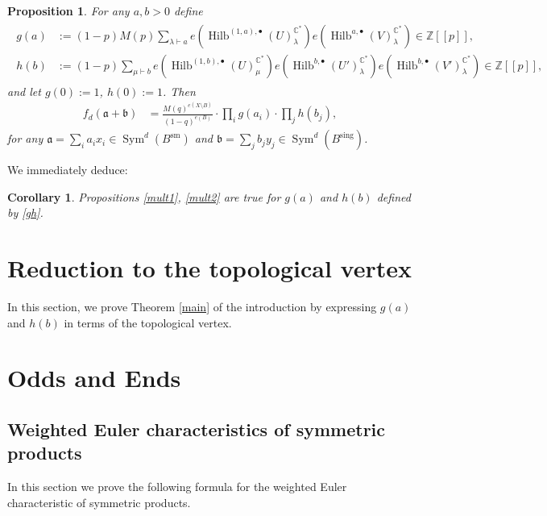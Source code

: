 \documentclass{amsart}
\newtheorem{proposition}[theorem]{Proposition}
\newtheorem{corollary}[theorem]{Corollary}
\theoremstyle{definition}
\newcommand{\CC} {\mathbb{C}}          %
\newcommand{\ZZ} {\mathbb{Z}}		%
\newcommand{\Sym}{\operatorname{Sym}}
\newcommand{\Hilb}{\operatorname{Hilb}}
\newcommand{\sm}{\operatorname{sm}}
\newcommand{\sing}{\operatorname{sing}}
\begin{document}
\begin{proposition}
For any $a,b>0$ define
\begin{align}
\begin{split} \label{gh}
g(a) &:= (1-p) M(p) \sum_{\lambda \vdash a} e(\Hilb^{(1,a),\bullet}(U)_{\lambda}^{\CC^*}) e(\Hilb^{a,\bullet}(V)_{\lambda}^{\CC^*}) \in \ZZ[\![p]\!], \\
h(b) &:= (1-p) \sum_{\mu \vdash b} e(\Hilb^{(1,b),\bullet}(U)_{\mu}^{\CC^*}) e(\Hilb^{b,\bullet}(U')_{\lambda}^{\CC^*}) e(\Hilb^{b,\bullet}(V')_{\lambda}^{\CC^*})  \in \ZZ[\![p]\!],
\end{split}
\end{align}
and let $g(0) := 1$, $h(0) :=1$. Then
\begin{align*}
f_{d}(\mathfrak{a} + \mathfrak{b}) &= \frac{M(q)^{e(X\setminus B)}}{(1-q)^{e(B)}} \cdot \prod_{i} g(a_i) \cdot \prod_{j} h(b_j), 
\end{align*}
for any $\mathfrak{a} = \sum_i a_i x_i \in \Sym^{d}(B^{\sm})$ and $\mathfrak{b} = \sum_j b_j y_j \in \Sym^{d}(B^{\sing})$.
\end{proposition}
   
We immediately deduce:  
\begin{corollary}
Propositions \ref{mult1}, \ref{mult2} are true for $g(a)$ and $h(b)$ defined by \eqref{gh}.
\end{corollary}   
   
   
\section{Reduction to the topological vertex}   

In this section, we prove Theorem \ref{main} of the introduction by expressing $g(a)$ and $h(b)$ in terms of the topological vertex. 
   
   

\appendix
\section{Odds and Ends}\label{appendix: odds and ends}


\subsection{Weighted Euler characteristics of symmetric products}

In this section we prove the following formula for the weighted Euler
characteristic of symmetric products.
\end{document}
